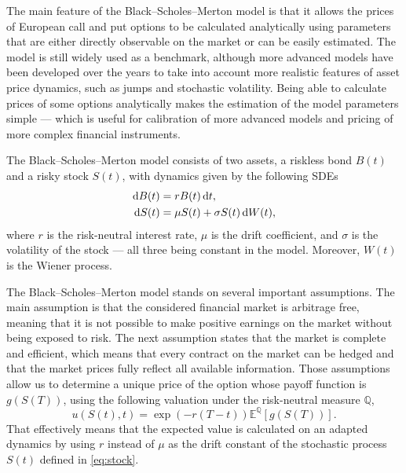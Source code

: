 \documentclass{UUThesisTemplate}
\begin{document}
\par
The main feature of the Black--Scholes--Merton model is that it allows the prices of European call and put options to be calculated analytically using parameters that are either directly observable on the market or can be easily estimated. The model is still widely used as a benchmark, although more advanced models have been developed over the years to take into account more realistic features of asset price dynamics, such as jumps and stochastic volatility. Being able to calculate prices of some options analytically makes the estimation of the model parameters simple --- which is useful for calibration of more advanced models and pricing of more complex financial instruments.
\par
The Black--Scholes--Merton model consists of two assets, a riskless bond $B(t)$ and a risky stock $S(t)$, with dynamics given by the following SDEs
\begin{align}
\dif B(t) &= r B(t) \dif t, \label{eq:bond} \\
\dif S(t) &= \mu S(t) + \sigma S(t) \dif W(t), \label{eq:stock}
\end{align}
where $r$ is the risk-neutral interest rate, $\mu$ is the drift coefficient, and $\sigma$ is the volatility of the stock --- all three being constant in the model. Moreover, $W(t)$ is the Wiener process.

\par
The Black--Scholes--Merton model stands on several important assumptions. The main assumption is that the considered financial market is arbitrage free, meaning that it is not possible to make positive earnings on the market without being exposed to risk. The next assumption states that the market is complete and efficient, which means that every contract on the market can be hedged and that the market prices fully reflect all available information. Those assumptions allow us to determine a unique price of the option whose payoff function is $g(S(T))$, using the following valuation under the risk-neutral measure $\mathbb{Q}$,
\begin{equation}
\label{eq:mc}
u(S(t), t)=\exp\left(-r(T-t)\right)\mathbb{E}^{\mathbb{Q}}\left[g(S(T))\right].
\end{equation}
That effectively means that the expected value is calculated on an adapted dynamics by using $r$ instead of $\mu$ as the drift constant of the stochastic process $S(t)$ defined in \eqref{eq:stock}. 
\end{document}

